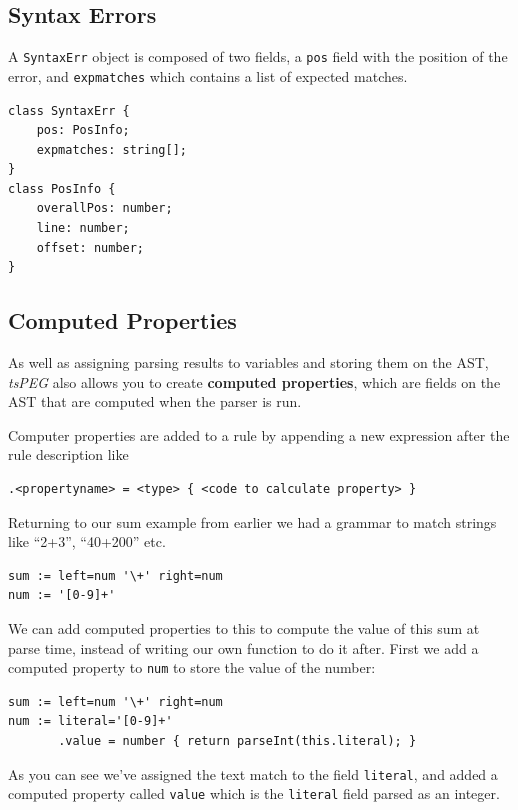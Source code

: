 \hypertarget{syntax-errors}{\subsection{Syntax
Errors}\label{syntax-errors}}

A \texttt{SyntaxErr} object is composed of two fields, a \texttt{pos}
field with the position of the error, and \texttt{expmatches} which
contains a list of expected matches.

\begin{verbatim}
class SyntaxErr {
    pos: PosInfo;
    expmatches: string[];
}
class PosInfo {
    overallPos: number;
    line: number;
    offset: number;
}
\end{verbatim}

\hypertarget{computed-properties}{\subsection{Computed
Properties}\label{computed-properties}}

As well as assigning parsing results to variables and storing them on
the AST, \emph{tsPEG} also allows you to create \textbf{computed
properties}, which are fields on the AST that are computed when the
parser is run.

Computer properties are added to a rule by appending a new expression
after the rule description like

\begin{verbatim}
.<propertyname> = <type> { <code to calculate property> }
\end{verbatim}

Returning to our sum example from earlier we had a grammar to match
strings like ``2+3'', ``40+200'' etc.

\begin{verbatim}
sum := left=num '\+' right=num
num := '[0-9]+'
\end{verbatim}

We can add computed properties to this to compute the value of this sum
at parse time, instead of writing our own function to do it after. First
we add a computed property to \texttt{num} to store the value of the
number:

\begin{verbatim}
sum := left=num '\+' right=num
num := literal='[0-9]+'
       .value = number { return parseInt(this.literal); }
\end{verbatim}

As you can see we've assigned the text match to the field
\texttt{literal}, and added a computed property called \texttt{value}
which is the \texttt{literal} field parsed as an integer.


